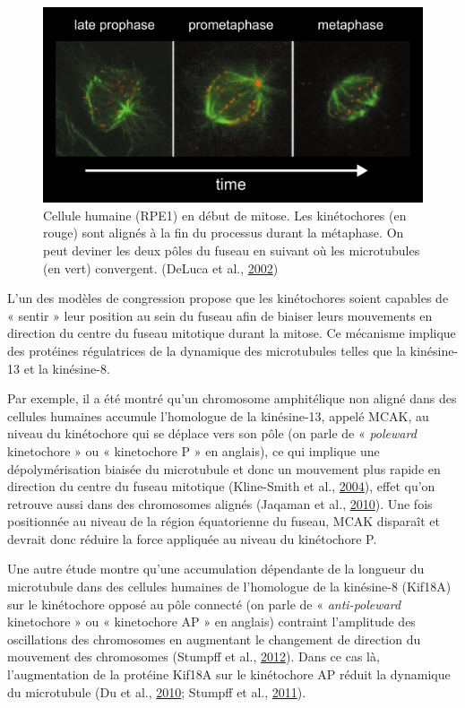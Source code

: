 \documentclass[12pt,a4paper,twoside,openright]{book}
\begin{document}
\begin{figure}[htbp]
\centering
\includegraphics{figures/intro/congression.png}
\caption[Cellule humaine de la prophase à la métaphase]{\label{fig:congression}Cellule
humaine (RPE1) en début de mitose. Les kinétochores (en rouge) sont
alignés à la fin du processus durant la métaphase. On peut deviner les
deux pôles du fuseau en suivant où les microtubules (en vert)
convergent. (DeLuca et al., \hyperref[ref-DeLuca2002]{2002})}
\end{figure}

L'un des modèles de congression propose que les kinétochores soient
capables de « sentir » leur position au sein du fuseau afin de biaiser
leurs mouvements en direction du centre du fuseau mitotique durant la
mitose. Ce mécanisme implique des protéines régulatrices de la dynamique
des microtubules telles que la kinésine-13 et la kinésine-8.

Par exemple, il a été montré qu'un chromosome amphitélique non aligné
dans des cellules humaines accumule l'homologue de la kinésine-13,
appelé MCAK, au niveau du kinétochore qui se déplace vers son pôle (on
parle de « \emph{poleward} kinetochore » ou « kinetochore P » en
anglais), ce qui implique une dépolymérisation biaisée du microtubule et
donc un mouvement plus rapide en direction du centre du fuseau mitotique
(Kline-Smith et al., \hyperref[ref-Kline-Smith2004]{2004}), effet qu'on
retrouve aussi dans des chromosomes alignés (Jaqaman et al.,
\hyperref[ref-Jaqaman2010]{2010}). Une fois positionnée au niveau de la
région équatorienne du fuseau, MCAK disparaît et devrait donc réduire la
force appliquée au niveau du kinétochore P.

Une autre étude montre qu'une accumulation dépendante de la longueur du
microtubule dans des cellules humaines de l'homologue de la kinésine-8
(Kif18A) sur le kinétochore opposé au pôle connecté (on parle de «
\emph{anti-poleward} kinetochore » ou « kinetochore AP » en anglais)
contraint l'amplitude des oscillations des chromosomes en augmentant le
changement de direction du mouvement des chromosomes (Stumpff et al.,
\hyperref[ref-Stumpff2012]{2012}). Dans ce cas là, l'augmentation de la
protéine Kif18A sur le kinétochore AP réduit la dynamique du microtubule
(Du et al., \hyperref[ref-Du2010]{2010}; Stumpff et al.,
\hyperref[ref-Stumpff2011a]{2011}).
\end{document}
